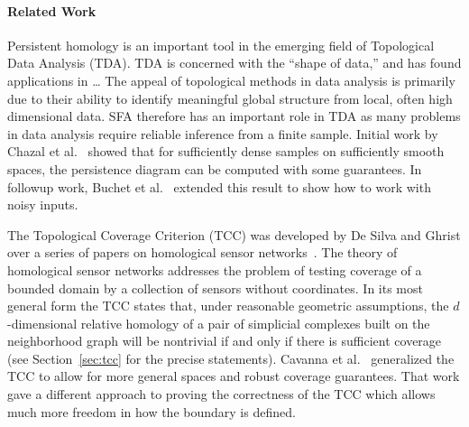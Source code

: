 \paragraph{Related Work}

Persistent homology is an important tool in the emerging field of Topological Data Analysis (TDA).
TDA is concerned with the ``shape of data,'' and has found applications in \ldots
The appeal of topological methods in data analysis is primarily due to their ability to identify meaningful global structure from local, often high dimensional data.
SFA therefore has an important role in TDA as many problems in data analysis require reliable inference from a finite sample.
Initial work by Chazal et al.~\cite{chazal09analysis} showed that for sufficiently dense samples on sufficiently smooth spaces, the persistence diagram can be computed with some guarantees.
In followup work, Buchet et al.~\cite{buchet15topological} extended this result to show how to work with noisy inputs.

The Topological Coverage Criterion (TCC) was developed by De Silva and Ghrist over a series of papers on homological sensor networks~\cite{desilva06coordinate,desilva07coverage,desilva07homological}.
The theory of homological sensor networks addresses the problem of testing coverage of a bounded domain by a collection of sensors without coordinates.
In its most general form the TCC states that, under reasonable geometric assumptions, the $d$-dimensional relative homology of a pair of simplicial complexes built on the neighborhood graph will be nontrivial if and only if there is sufficient coverage (see Section~\ref{sec:tcc} for the precise statements).
Cavanna et al.~\cite{cavanna2017when} generalized the TCC to allow for more general spaces and robust coverage guarantees.
That work gave a different approach to proving the correctness of the TCC which allows much more freedom in how the boundary is defined.


